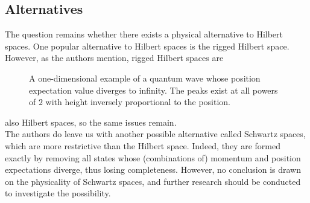 \documentclass[12pt]{article}
\begin{document}
\begin{multicols}{2}
    \section*{Alternatives}
    The question remains whether there exists a physical alternative to Hilbert spaces. One popular alternative to Hilbert spaces is the rigged Hilbert space\cite{de_la_madrid_role_2005}. However, as the authors mention, rigged Hilbert spaces are
    \begin{figure}[H]
        \centering
        \resizebox{\columnwidth}{!}{
        
        }
        \caption{A one-dimensional example of a quantum wave whose position expectation value diverges to infinity. The peaks exist at all powers of \(2\) with height inversely proportional to the position.}
        \label{fig:sketch}
    \end{figure}\noindent
    also Hilbert spaces, so the same issues remain.\\
    The authors do leave us with another possible alternative called Schwartz spaces\cite{becnel_schwartz_2015}, which are more restrictive than the Hilbert space. Indeed, they are formed exactly by removing all states whose (combinations of) momentum and position expectations diverge, thus losing completeness. However, no conclusion is drawn on the physicality of Schwartz spaces, and further research should be conducted to investigate the possibility.
\end{multicols}
\printbibliography
\end{document}
